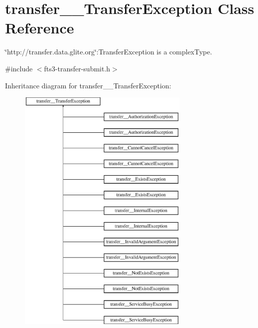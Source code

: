 \section{transfer\_\-\_\-TransferException Class Reference}
\label{classtransfer____TransferException}


\char`\"{}http://transfer.data.glite.org\char`\"{}:TransferException is a complexType.  




{\ttfamily \#include $<$fts3-\/transfer-\/submit.h$>$}

Inheritance diagram for transfer\_\-\_\-TransferException:\begin{figure}[H]
\begin{center}
\leavevmode
\includegraphics[height=12.000000cm]{classtransfer____TransferException}
\end{center}
\end{figure}
